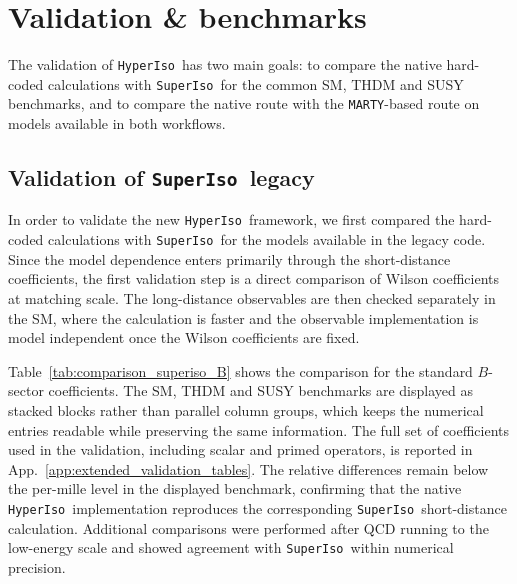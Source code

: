 \documentclass[preprint,11pt]{elsarticle}
\newcommand{\hi}{\texttt{HyperIso}}
\newcommand{\spi}{\texttt{SuperIso}}
\newcommand{\mty}{\texttt{MARTY}}
\begin{document}
\section{Validation \& benchmarks}

The validation of \hi~has two main goals: to compare the native hard-coded calculations with \spi~for the common SM, THDM and SUSY benchmarks, and to compare the native route with the \mty-based route on models available in both workflows.


\subsection{Validation of \spi~legacy}

In order to validate the new \hi~framework, we first compared the hard-coded calculations with \spi~for the models available in the legacy code.  Since the model dependence enters primarily through the short-distance coefficients, the first validation step is a direct comparison of Wilson coefficients at matching scale.  The long-distance observables are then checked separately in the SM, where the calculation is faster and the observable implementation is model independent once the Wilson coefficients are fixed.

Table~\ref{tab:comparison_superiso_B} shows the comparison for the standard \(B\)-sector coefficients.  The SM, THDM and SUSY benchmarks are displayed as stacked blocks rather than parallel column groups, which keeps the numerical entries readable while preserving the same information.  The full set of coefficients used in the validation, including scalar and primed operators, is reported in App.~\ref{app:extended_validation_tables}.  The relative differences remain below the per-mille level in the displayed benchmark, confirming that the native \hi~implementation reproduces the corresponding \spi~short-distance calculation.  Additional comparisons were performed after QCD running to the low-energy scale and showed agreement with \spi~within numerical precision.
\end{document}
